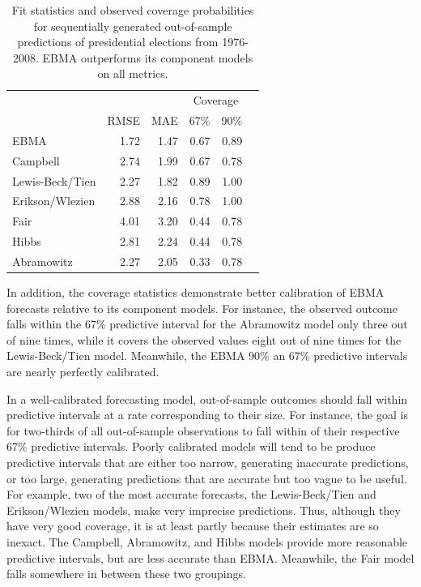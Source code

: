 \documentclass[pdftex,12pt,fullpage,oneside]{amsart}
\begin{document}
\begin{table}[ht!]
  \caption{\footnotesize Fit statistics and observed coverage
    probabilities for sequentially generated out-of-sample predictions of
    presidential elections from 1976-2008.  EBMA outperforms its
    component models on all metrics.}
\label{Pres-Res} \small
\begin{center}
\begin{tabular}{lrrrrr}
\toprule
                        &              &              & \multicolumn{2}{c}{Coverage} \\ 
                    	&	RMSE&	MAE	&67\% &   90\%      \\
\midrule
EBMA	           &	1.72	&	1.47	&	0.67	&	0.89	\\
Campbell	           &	2.74	&	1.99	&	0.67	&	0.78	\\
Lewis-Beck/Tien&	2.27	&	1.82	&	0.89	&	1.00	\\
Erikson/Wlezien&	2.88	&	2.16	&	0.78	&	1.00	\\
Fair	                   &	4.01	&	3.20	&	0.44	&	0.78	\\
Hibbs	           &	2.81	&	2.24	&	0.44&      0.78 \\
Abramowitz	   &	2.27	&	2.05	&	0.33	&     0.78	\\

\bottomrule
\end{tabular}
\end{center}
\end{table}

 In addition, the coverage statistics demonstrate better calibration
 of EBMA forecasts relative to its component models.  For instance,
 the observed outcome falls within the 67\% predictive interval for
 the Abramowitz model only three out of nine times, while it covers the
 observed values eight out of nine times for the Lewis-Beck/Tien
 model.  Meanwhile, the EBMA 90\% an 67\% predictive intervals are
 nearly perfectly calibrated.

 In a well-calibrated forecasting model, out-of-sample outcomes should
 fall within predictive intervals at a rate corresponding to their
 size.  For instance, the goal is for two-thirds of all out-of-sample
 observations to fall within of their respective 67\% predictive
 intervals.  Poorly calibrated models will tend to be produce
 predictive intervals that are either too narrow, generating
 inaccurate predictions, or too large, generating predictions that are
 accurate but too vague to be useful. For example, two of the most  %
 accurate forecasts, the Lewis-Beck/Tien and Erikson/Wlezien models,  %
 make very imprecise predictions.  Thus, although they have very good
 coverage, it is at least partly because their estimates are so
 inexact.  The Campbell, Abramowitz, and Hibbs models provide more
 reasonable predictive intervals, but are less accurate than
 EBMA. Meanwhile, the Fair model falls somewhere in between these two
 groupings.	
\end{document}
